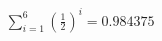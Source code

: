 \documentclass[preview]{standalone}
\begin{document}
\begin{align*}
\sum_{i=1}^{6} \left(\frac{1}{2}\right)^i = {0.984375}
\end{align*}
\end{document}
